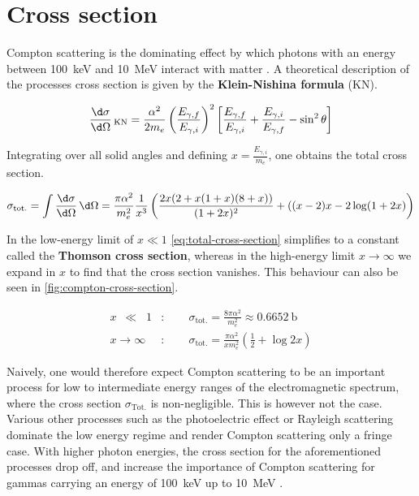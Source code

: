 
\section{Cross section}
\label{sec:compton-cross-section}

Compton scattering is the dominating effect by which photons with an energy between
\SI{100}{\kilo\electronvolt} and \SI{10}{\mega\electronvolt} interact with matter
\cite{damashek1970forward}. A theoretical description of the processes cross section
is given by the \textbf{Klein-Nishina formula} (KN).

\begin{equation}
\label{eq:klein-nishina}
\frac{\d\sigma}{\d\Omega}\,_\text{KN} = \frac{\alpha^2}{2m_e}\left(\frac{E_{\gamma,f}}{E_{\gamma,i}}\right)^2\left[\frac{E_{\gamma,f}}{E_{\gamma,i}}+\frac{E_{\gamma,i}}{E_{\gamma,f}}-\sin^2\theta\right]
\end{equation}

Integrating over all solid angles and defining $x=\frac{E_{\gamma,i}}{m_e}$, one
obtains the total cross section.

\begin{equation}
\label{eq:total-cross-section}
\sigma_\text{tot.} = \int \frac{\d\sigma}{\d\Omega}\,\d\Omega = \frac{\pi\alpha^2}{m_e^2}\frac{1}{x^3}\left(\frac{2x(2+x(1+x)(8+x))}{(1+2x)^2} + ((x-2)x-2\log(1+2x)\right)
\end{equation}

In the low-energy limit of $x\ll1$ \autoref{eq:total-cross-section} simplifies to
a constant called the \textbf{Thomson cross section}, whereas in the high-energy
limit $x\rightarrow\infty$ we expand in $x$ to find that the cross section vanishes.
This behaviour can also be seen in \autoref{fig:compton-cross-section}.

\begin{align*}
x\;\:\ll\;\;1&:\qquad\sigma_\text{tot.} = \frac{8\pi\alpha^2}{m_e^2} \approx \SI{0.6652}{\barn}\\
x\longrightarrow\infty&:\qquad\sigma_\text{tot.} = \frac{\pi\alpha^2}{x m_e^2}\left(\frac{1}{2} + \log2x\right)
\end{align*}

Naively, one would therefore expect Compton scattering to be an important process
for low to intermediate energy ranges of the electromagnetic spectrum, where the
cross section $\sigma_\text{Tot.}$ is non-negligible. This is however not the case.
Various other processes such as the photoelectric effect or Rayleigh scattering
dominate the low energy regime and render Compton scattering only a fringe case.
With higher photon energies, the cross section for the aforementioned processes
drop off, and increase the importance of Compton scattering for gammas carrying
an energy of \SI{100}{\kilo\electronvolt} up to \SI{10}{\mega\electronvolt} .
